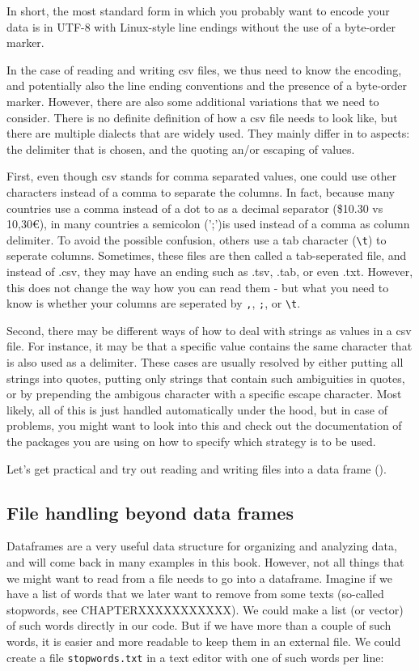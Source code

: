 In short, the most standard form in which you probably want to encode your data is in UTF-8 with Linux-style line endings without the use of a byte-order marker.


In the case of reading and writing csv files, we thus need to know the encoding, and potentially also the line ending conventions and the presence of a byte-order marker. However, there are also some additional variations that we need to consider. There is no definite definition of how a csv file needs to look like, but there are multiple dialects that are widely used. They mainly differ in to aspects: the delimiter that is chosen, and the quoting an/or escaping of values.

First, even though csv stands for comma separated values, one could use other characters instead of a comma to separate the columns. In fact, because many countries use a comma instead of a dot to as a decimal separator (\$10.30 vs 10,30€), in many countries a semicolon (';')is used instead of a comma as column delimiter. To avoid the possible confusion, others use a tab character (\texttt{\textbackslash t}) to seperate columns. Sometimes, these files are then called a tab-seperated file, and instead of .csv, they may have an ending such as .tsv, .tab, or even .txt. However, this does not change the way how you can read them - but what you need to know is whether your columns are seperated by \texttt{,}, \texttt{;}, or \texttt{\textbackslash t}. 

Second, there may be different ways of how to deal with strings as values in a csv file. For instance, it may be that a specific value contains the same character that is also used as a delimiter. These cases are usually resolved by either putting all strings into quotes, putting only strings that contain such ambiguities in quotes, or by prepending the ambigous character with a specific escape character. Most likely, all of this is just handled automatically under the hood, but in case of problems, you might want to look into this and check out the documentation of the packages you are using on how to specify which strategy is to be used.

Let's get practical and try out reading and writing files into a data frame ().



\subsection{File handling beyond data frames}
Dataframes are a very useful data structure for organizing and analyzing data, and will come back in many examples in this book.
However, not all things that we might want to read from a file needs to go into a dataframe.
Imagine if we have a list of words that we later want to remove from some texts (so-called stopwords, see CHAPTERXXXXXXXXXXX).
We could make a list (or vector) of such words directly in our code. 
But if we have more than a couple of such words, it is easier and more readable to keep them in an external file. We could create a file \texttt{stopwords.txt} in a text editor with one of such words per line:

